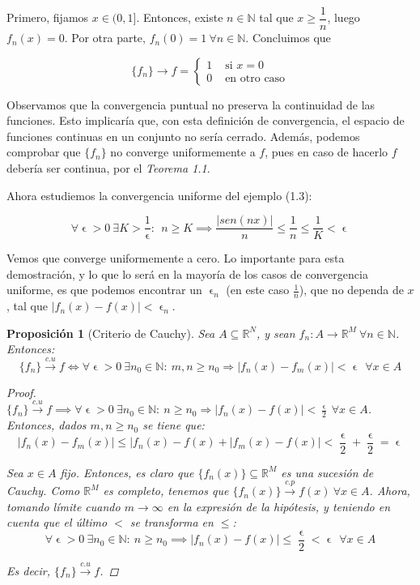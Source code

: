 \documentclass[11pt, a4paper]{article}
\let\epsilon\upvarepsilon
\providecommand{\abs}[1]{\lvert#1\rvert}
\newcommand{\N}{\mathbb{N}}
\newcommand{\fn}{\{f_n\}}
\theoremstyle{theorem-style}
\newtheorem*{nprop}{Proposición}
\theoremstyle{definition-style}
\theoremstyle{remark-style}
\theoremstyle{example-style}
\begin{document}
Primero, fijamos $x\in (0,1]$. Entonces, existe $n\in \N$ tal que $x \ge \dfrac{1}{n}$, luego $f_n(x) = 0$. Por otra parte, $f_n(0) = 1\ \forall n\in \N$. Concluimos que

\[
	\fn\to f = \begin{cases}
	1 & \text{ si } x=0\\
	0 & \text{ en otro caso}
\end{cases}
\]

Observamos que la convergencia puntual no preserva la continuidad de las funciones. Esto implicaría que, con esta definición de convergencia, el espacio de funciones continuas en un conjunto no sería cerrado. Además, podemos comprobar que $\fn$ no converge uniformemente a $f$, pues en caso de hacerlo $f$ debería ser continua, por el \textit{Teorema 1.1}.

Ahora estudiemos la convergencia uniforme del ejemplo (1.3):

\[
\forall\epsilon>0\ \exists K>\dfrac{1}{\epsilon}:\ \ n\ge K \implies \dfrac{\abs{sen(nx)}}{n} \le \dfrac{1}{n} \le \dfrac{1}{K} < \epsilon
\]

Vemos que converge uniformemente a cero. Lo importante para esta demostración, y lo que lo será en la mayoría de los casos de convergencia uniforme, es que podemos encontrar un $\epsilon_n$ (en este caso $\frac{1}{n}$), que no dependa de $x$, tal que $\abs{f_n(x)-f(x)} < \epsilon_n$.

\begin{nprop}[Criterio de Cauchy]
	Sea $A \subseteq \mathbb{R}^N$, y sean $f_n: A \longrightarrow \mathbb{R}^M \ \forall n \in \mathbb{N}$. Entonces: $$\fn \xrightarrow {c.u} f \iff \forall \epsilon > 0\ \exists n_0 \in \mathbb{N}:\ m,n \ge n_0 \Rightarrow |f_n(x) - f_m(x)| < \epsilon\ \ \forall x \in A$$
	
\begin{proof} \hfill \\
\boxed{\Rightarrow}	 $\fn \xrightarrow {c.u} f \implies \forall \epsilon > 0\ \exists n_0 \in \mathbb{N}:\ n \ge n_0 \Rightarrow |f_n(x) - f(x)| < \frac{\epsilon}{2}\ \forall x \in A$. Entonces, dados $m,n \ge n_0$ se tiene que: $$ |f_n(x) - f_m(x)| \le |f_n(x) - f(x) + |f_m(x) - f(x)| < \frac{\epsilon}{2} + \frac{\epsilon}{2} = \epsilon$$

\boxed{\Leftarrow} Sea $x \in A$ fijo. Entonces, es claro que $\{f_n(x)\} \subseteq \mathbb{R}^M$ es una sucesión de Cauchy. Como $\mathbb{R}^M$ es completo, tenemos que $\{f_n(x)\} \xrightarrow {c.p} f(x)\ \forall x \in A$. Ahora, tomando límite cuando $m \to \infty$ en la expresión de la hipótesis, y teniendo en cuenta que el último $<$ se transforma en $\le$: $$\forall \epsilon > 0\ \exists n_0 \in \mathbb{N}:\ n \ge n_0 \implies |f_n(x) - f(x)| \le \frac{\epsilon}{2} < \epsilon\ \ \forall x \in A$$

Es decir, $\fn \xrightarrow {c.u} f$.
\end{proof}
\end{nprop}
\end{document}
